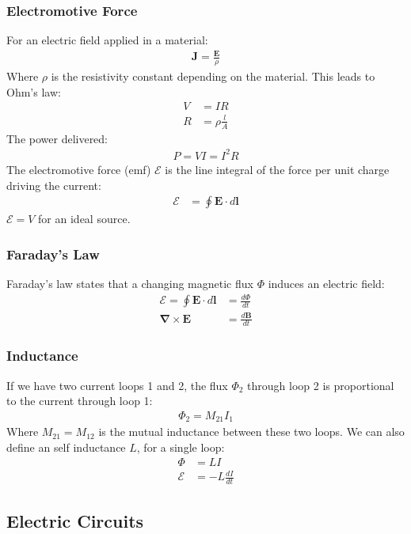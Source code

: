 \documentclass[11pt]{article}
\newcommand{\emf}{\mathcal{E}}					%
\newcommand{\ve}[1]{\ensuremath{\bm{#1}}}			%
\begin{document}
\begin{multicols*}{3}
\subsubsection{Electromotive Force}
For an electric field applied in a material:
	\begin{align*}
	\ve{J} = \frac{\ve{E}}{\rho}
	\end{align*}
Where $\rho$ is the resistivity constant depending on the material.
This leads to Ohm's law:
	\begin{align*}
	V&=IR\\
	R&=\rho\frac{l}{A}
	\end{align*}
The power delivered:
	\begin{align*}
	P=VI=I^2R
	\end{align*}
The electromotive force (emf) $\emf$ is the line integral of the force per unit charge driving the current:
	\begin{align*}
	\emf &=\oint \ve{E} \cdot d\ve{l}
	\end{align*}
$\emf=V$ for an ideal source.
\subsubsection{Faraday's Law}
Faraday's law states that a changing magnetic flux $\Phi$ induces an electric field:
	\begin{align*}
	\emf =\oint \ve{E} \cdot d\ve{l} &= \frac{d\Phi}{dt}\\
	\ve{\nabla}\times\ve{E}&=\frac{d\ve{B}}{dt}
	\end{align*}
\subsubsection{Inductance}
If we have two current loops 1 and 2, the flux $\Phi_2$ through loop 2 is proportional to the current through loop 1:
	\begin{align*}
	\Phi_2 = M_{21}I_1
	\end{align*}
Where $M_{21}=M_{12}$ is the mutual inductance between these two loops. We can also define an self inductance $L$, for a single loop:
	\begin{align*}
	\Phi &= LI\\
	\emf &= -L\frac{dI}{dt}
	\end{align*}
\subsection{Electric Circuits}


\end{multicols*}
\end{document}
